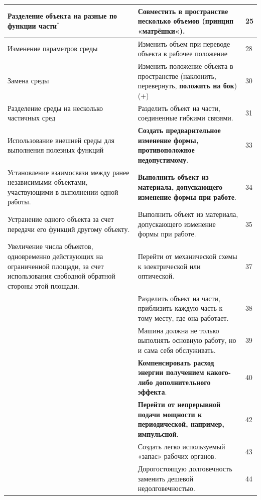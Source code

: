 \documentclass[11pt,a4paper]{article}
\begin{document}
\begin{center}
  \begin{tabular}{|p{}|p{}|p{}|}\hline
Разделение объекта на разные по функции части$^\ast$ & Совместить в пространстве
несколько объемов (принцип «матрёшки«). & 25\\\hline
Изменение параметров среды & Изменить объем при переводе объекта в рабочее
положение & 28\\\hline
Замена среды & Изменить положение объекта в пространстве (наклонить,
перевернуть, \textbf{положить на бок}) (+) & 30\\\hline
Разделение среды на несколько частичных сред & Разделить объект на части,
соединенные гибкими связями. & 31\\\hline
Использование внешней среды для выполнения полезных функций & \textbf{Создать 
предварительное изменение формы, противоположное недопустимому}. & 33\\\hline
Установление взаимосвязи между ранее независимыми объектами, участвующими в
выполнении одной работы. & \textbf{Выполнить объект из материала, допускающего 
изменение формы при работе}. & 34\\\hline
Устранение одного объекта за счет передачи его функций другому объекту. &
Выполнить объект из материала, допускающего изменение формы при работе. &
35\\\hline
Увеличение числа объектов, одновременно действующих на ограниченной площади,
за счет использования свободной обратной стороны этой площади. & Перейти от
механической схемы к электрической или оптической. & 37\\\hline
&Разделить объект на части, приблизить каждую часть к тому месту, где она
работает. &38\\\hline
&Машина должна не только выполнять основную работу, но и сама себя
обслуживать. &39\\\hline
&\textbf{Компенсировать расход энергии получением какого-либо дополнительного
  эффекта}. &40\\\hline
&\textbf{Перейти от непрерывной подачи мощности к периодической, например,
  импульсной}. &42\\\hline
&Создать легко используемый «запас» рабочих органов. & 43\\\hline
&Дорогостоящую долговечность заменить дешевой недолговечностью. & 44\\\hline
  \end{tabular}


\end{center}
\end{document}
